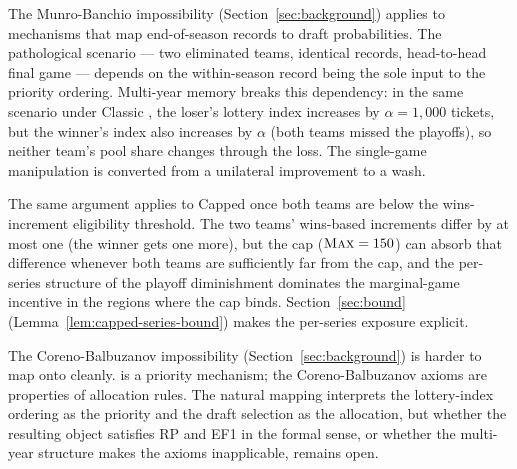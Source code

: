 The Munro-Banchio impossibility (Section~\ref{sec:background}) applies to mechanisms that map end-of-season records to draft probabilities. The pathological scenario --- two eliminated teams, identical records, head-to-head final game --- depends on the within-season record being the sole input to the priority ordering. Multi-year memory breaks this dependency: in the same scenario under Classic \cola{}, the loser's lottery index increases by $\alpha = 1{,}000$ tickets, but the winner's index also increases by $\alpha$ (both teams missed the playoffs), so neither team's pool share changes through the loss. The single-game manipulation is converted from a unilateral improvement to a wash.

The same argument applies to Capped \cola{} once both teams are below the wins-increment eligibility threshold. The two teams' wins-based increments differ by at most one (the winner gets one more), but the cap ($\textup{\textsc{Max}} = 150$) can absorb that difference whenever both teams are sufficiently far from the cap, and the per-series structure of the playoff diminishment dominates the marginal-game incentive in the regions where the cap binds. Section~\ref{sec:bound} (Lemma~\ref{lem:capped-series-bound}) makes the per-series exposure explicit.

The Coreno-Balbuzanov impossibility (Section~\ref{sec:background}) is harder to map onto \cola{} cleanly. \cola{} is a priority mechanism; the Coreno-Balbuzanov axioms are properties of allocation rules. The natural mapping interprets the lottery-index ordering as the priority and the draft selection as the allocation, but whether the resulting object satisfies RP and EF1 in the formal sense, or whether the multi-year structure makes the axioms inapplicable, remains open. 
